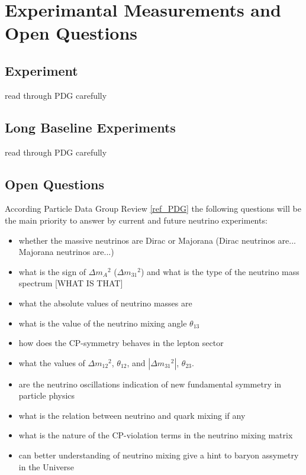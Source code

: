 \section{Experimantal Measurements and Open Questions}
\subsection{Experiment}
read through PDG carefully
\subsection{Long Baseline Experiments}
read through PDG carefully
\subsection{Open Questions}
According Particle Data Group Review \ref{ref_PDG} the following questions will be the main priority to answer by current and future neutrino experiments:
\begin{itemize}
  \item whether the massive neutrinos are Dirac or Majorana (Dirac neutrinos are... Majorana neutrinos are...)
  \item what is the sign of $\Delta{m_A}^2$ ($\Delta{m_31}^2$) and what is the type of the neutrino mass spectrum [WHAT IS THAT]
  \item what the absolute values of neutrino masses are
  \item what is the value of the neutrino mixing angle $\theta_{13}$
  \item how does the CP-symmetry behaves in the lepton sector
  \item what the values of $\Delta{m_{12}}^2$, $\theta_{12}$, and $|\Delta{m_{31}}^2|$, $\theta_{23}$.
  \item are the neutrino oscillations indication of new fundamental symmetry in particle physics
  \item what is the relation between neutrino and quark mixing if any
  \item what is the nature of the CP-violation terms in the neutrino mixing matrix
  \item can better understanding of neutrino mixing give a hint to baryon assymetry in the Universe 
\end{itemize}  
